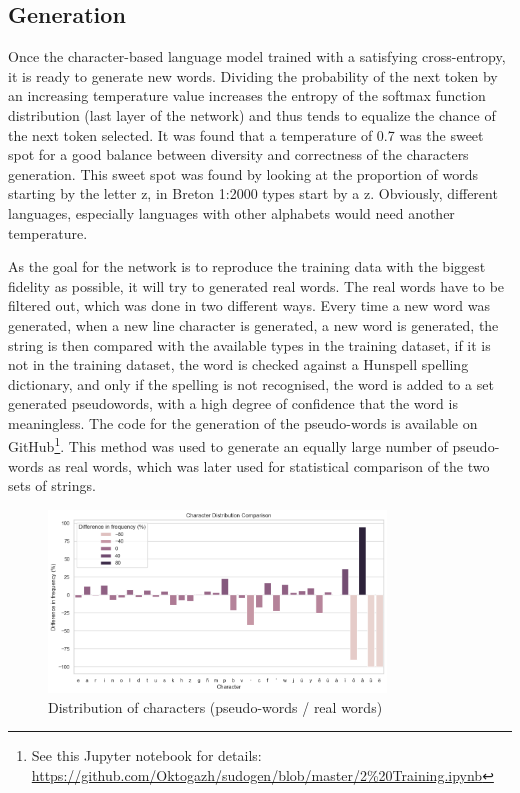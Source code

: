     \subsection{Generation}
Once the character-based language model trained with a satisfying cross-entropy, it is ready to generate new words. Dividing the probability of the next token by an increasing temperature value increases the entropy of the softmax function distribution (last layer of the network) and thus tends to equalize the chance of the next token selected. It was found that a temperature of 0.7 was the sweet spot for a good balance between diversity and correctness of the characters generation. This sweet spot was found by looking at the proportion of words starting by the letter z, in Breton 1:2000 types start by a z. Obviously, different languages, especially languages with other alphabets would need another temperature.

As the goal for the network is to reproduce the training data with the biggest fidelity as possible, it will try to generated real words. The real words have to be filtered out, which was done in two different ways. Every time a new word was generated, when a new line character is generated, a new word is generated, the string is then compared with the available types in the training dataset, if it is not in the training dataset, the word is checked against a Hunspell spelling dictionary, and only if the spelling is not recognised, the word is added to a set generated pseudowords, with a high degree of confidence that the word is meaningless. The code for the generation of the pseudo-words is available on GitHub\footnote{See this Jupyter notebook for details: \url{https://github.com/Oktogazh/sudogen/blob/master/2\%20Training.ipynb}}. This method was used to generate an equally large number of pseudo-words as real words, which was later used for statistical comparison of the two sets of strings.

\begin{figure}[htbp]
    \centering
    \includegraphics[width=0.8\textwidth]{figures/chars.png}
    \caption{Distribution of characters (pseudo-words / real words)}
\end{figure}\label{fig:chars}

